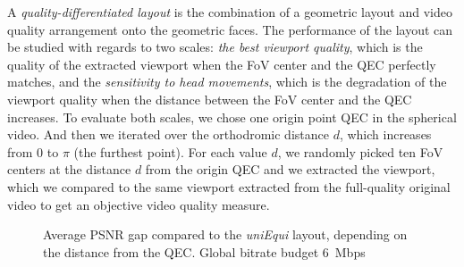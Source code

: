 A \textit{quality-differentiated layout} is the combination of a geometric layout and video quality 
arrangement onto the geometric faces. The performance of the layout can be studied with
regards to two scales: \emph{the best viewport quality}, which is the quality of the extracted viewport 
when the FoV center and the QEC perfectly matches, and the \emph{sensitivity to head movements}, 
which is the degradation of the viewport quality when the distance between the FoV center 
and the QEC increases. 
To evaluate both scales, we chose one origin point \ac{QEC} in the spherical video. And then we iterated
over the orthodromic distance $d$, which increases from 0 to $\pi$ (the furthest point). For each
value $d$, we randomly picked ten \ac{FoV} centers at the distance $d$ from the origin \ac{QEC}
and we extracted the viewport, which we compared to the same viewport extracted from the 
full-quality original video to get an objective video quality measure.

%

\begin{figure}
    
    \caption{Average \acs{PSNR} gap compared to the \emph{uniEqui} layout, depending on the distance from the \acs{QEC}. Global bitrate budget \SI{6}{\mega bps}}
    \label{fig:dist_quality_psnr}
\end{figure}

